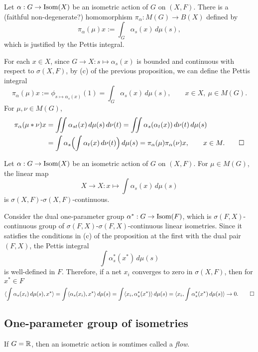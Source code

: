 \documentclass{../../small}
\begin{document}
\begin{prop}
Let $\alpha:G\to\operatorname{Isom}(X)$ be an isometric action of $G$ on $(X,F)$.
There is a (faithful non-degenerate?) homomorphism $\pi_\alpha:M(G)\to B(X)$ defined by
\[\pi_\alpha(\mu)x:=\int_G\alpha_s(x)\,d\mu(s),\]
which is justified by the Pettis integral.
\end{prop}
\begin{pf}
For each $x\in X$, since $G\to X:s\mapsto\alpha_s(x)$ is bounded and continuous with respect to $\sigma(X,F)$, by (c) of the previous proposition, we can define the Pettis integral
\[\pi_\alpha(\mu)x:=\phi_{s\mapsto\alpha_s(x)}(1)=\int_G\alpha_s(x)\,d\mu(s),\qquad x\in X,\ \mu\in M(G).\]
For $\mu,\nu\in M(G)$,
\begin{align*}
\pi_\alpha(\mu*\nu)x
&=\iint\alpha_{st}(x)\,d\mu(s)\,d\nu(t)=\iint\alpha_s(\alpha_t(x))\,d\nu(t)\,d\mu(s)\\
&=\int\alpha_s\Bigl(\int\alpha_t(x)\,d\nu(t)\Bigr)\,d\mu(s)=\pi_\alpha(\mu)\pi_\alpha(\nu)x,\qquad x\in M.\qedhere
\end{align*}
\end{pf}

\begin{prop}
Let $\alpha:G\to\operatorname{Isom}(X)$ be an isometric action of $G$ on $(X,F)$.
For $\mu\in M(G)$, the linear map
\[X\to X:x\mapsto\int\alpha_s(x)\,d\mu(s)\]
is $\sigma(X,F)$-$\sigma(X,F)$-continuous.
\end{prop}
\begin{pf}
Consider the dual one-parameter group $\alpha^*:G\to\operatorname{Isom}(F)$, which is $\sigma(F,X)$-continuous group of $\sigma(F,X)$-$\sigma(F,X)$-continuous linear isometries.
Since it satisfies the conditions in (c) of the proposition at the first with the dual pair $(F,X)$, the Pettis integral
\[\int\alpha_s^*(x^*)\,d\mu(s)\]
is well-defined in $F$.
Therefore, if a net $x_i$ converges to zero in $\sigma(X,F)$, then for $x^*\in F$
\[\langle\int\alpha_s(x_i)\,d\mu(s),x^*\rangle
=\int\langle\alpha_s(x_i),x^*\rangle\,d\mu(s)
=\int\langle x_i,\alpha_s^*(x^*)\rangle\,d\mu(s)
=\langle x_i,\int\alpha_s^*(x^*)\,d\mu(s)\rangle\to0.\qedhere\]
\end{pf}





\subsection{One-parameter group of isometries}

If $G=\mathbb{R}$, then an isometric action is somtimes called a \emph{flow}.
\end{document}

